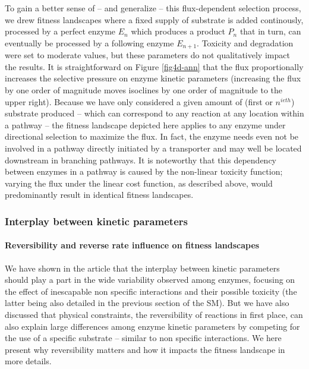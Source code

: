 To gain a better sense of -- and generalize -- this flux-dependent selection process, we drew fitness landscapes where a fixed supply of substrate is added continously, processed by a perfect enzyme $E_n$ which produces a product $P_n$ that in turn, can eventually be processed by a following enzyme $E_{n+1}$. 
Toxicity and degradation were set to moderate values, but these parameters do not qualitatively impact the results. It is straightforward on Figure \ref{fig4d-ann} that the flux proportionally increases the selective pressure on enzyme kinetic parameters (increasing the flux by one order of magnitude moves isoclines by one order of magnitude to the upper right). Because we have only considered a given amount of (first or $n^{ieth}$) substrate produced -- which can correspond to any reaction at any location within a pathway -- the fitness landscape depicted here applies to any enzyme under directional selection to maximize the flux. In fact, the enzyme needs even not be involved in a pathway directly initiated by a transporter and may well be located downstream in branching pathways. It is noteworthy that this dependency between enzymes in a pathway is caused by the non-linear toxicity function; varying the flux under the linear cost function, as described above, would predominantly result in identical fitness landscapes.

\subsubsection{Interplay between kinetic parameters\label{sec:IKP}}

\noindent\paragraph{Reversibility and reverse rate influence on fitness landscapes}

We have shown in the article that the interplay between kinetic parameters should play a part in the wide variability observed among enzymes, focusing on the effect of inescapable non specific interactions and their possible toxicity (the latter being also detailed in the previous section of the SM). But we have also discussed that physical constraints, the reversibility of reactions in first place, can also explain large differences among enzyme kinetic parameters by competing for the use of a specific substrate --  similar to non specific interactions. We here present why reversibility matters and how it impacts the fitness landscape in more details. %

